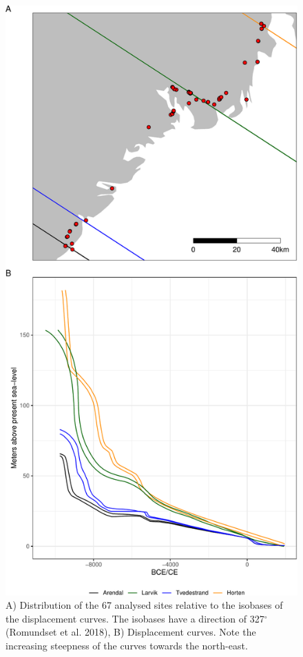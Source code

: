 \documentclass[
]{article}
\begin{document}
\begin{figure}

{\centering \includegraphics{../figures/map-iso-1} 

}

\caption{A) Distribution of the  67  analysed sites relative to the isobases of the displacement curves. The isobases have a direction of 327$^{\circ}$ (Romundset et al. 2018), B) Displacement curves. Note the increasing steepness of the curves towards the north-east.}\label{fig:map-iso}
\end{figure}
\end{document}
